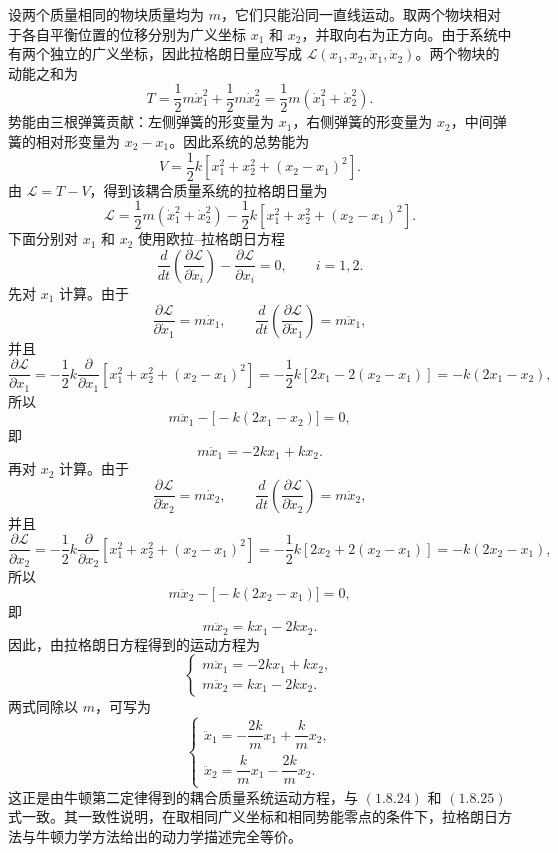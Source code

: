 \begin{solution}[耦合质量问题的拉格朗日量]
\answer
设两个质量相同的物块质量均为 \(m\)，它们只能沿同一直线运动。取两个物块相对于各自平衡位置的位移分别为广义坐标 \(x_1\) 和 \(x_2\)，并取向右为正方向。由于系统中有两个独立的广义坐标，因此拉格朗日量应写成 \(\mathcal{L}(x_1,x_2,\dot{x}_1,\dot{x}_2)\)。两个物块的动能之和为
\[
T=\frac{1}{2}m\dot{x}_1^2+\frac{1}{2}m\dot{x}_2^2=\frac{1}{2}m(\dot{x}_1^2+\dot{x}_2^2).
\]
势能由三根弹簧贡献：左侧弹簧的形变量为 \(x_1\)，右侧弹簧的形变量为 \(x_2\)，中间弹簧的相对形变量为 \(x_2-x_1\)。因此系统的总势能为
\[
V=\frac{1}{2}k\left[x_1^2+x_2^2+(x_2-x_1)^2\right].
\]
由 \(\mathcal{L}=T-V\)，得到该耦合质量系统的拉格朗日量为
\[
\mathcal{L}=\frac{1}{2}m(\dot{x}_1^2+\dot{x}_2^2)-\frac{1}{2}k\left[x_1^2+x_2^2+(x_2-x_1)^2\right].
\]
下面分别对 \(x_1\) 和 \(x_2\) 使用欧拉--拉格朗日方程
\[
\frac{d}{dt}\left(\frac{\partial \mathcal{L}}{\partial \dot{x}_i}\right)-\frac{\partial \mathcal{L}}{\partial x_i}=0,\qquad i=1,2.
\]
先对 \(x_1\) 计算。由于
\[
\frac{\partial \mathcal{L}}{\partial \dot{x}_1}=m\dot{x}_1,\qquad \frac{d}{dt}\left(\frac{\partial \mathcal{L}}{\partial \dot{x}_1}\right)=m\ddot{x}_1,
\]
并且
\[
\frac{\partial \mathcal{L}}{\partial x_1}
=-\frac{1}{2}k\frac{\partial}{\partial x_1}\left[x_1^2+x_2^2+(x_2-x_1)^2\right]
=-\frac{1}{2}k\left[2x_1-2(x_2-x_1)\right]
=-k(2x_1-x_2),
\]
所以
\[
m\ddot{x}_1-\big[-k(2x_1-x_2)\big]=0,
\]
即
\[
m\ddot{x}_1=-2kx_1+kx_2.
\]
再对 \(x_2\) 计算。由于
\[
\frac{\partial \mathcal{L}}{\partial \dot{x}_2}=m\dot{x}_2,\qquad \frac{d}{dt}\left(\frac{\partial \mathcal{L}}{\partial \dot{x}_2}\right)=m\ddot{x}_2,
\]
并且
\[
\frac{\partial \mathcal{L}}{\partial x_2}
=-\frac{1}{2}k\frac{\partial}{\partial x_2}\left[x_1^2+x_2^2+(x_2-x_1)^2\right]
=-\frac{1}{2}k\left[2x_2+2(x_2-x_1)\right]
=-k(2x_2-x_1),
\]
所以
\[
m\ddot{x}_2-\big[-k(2x_2-x_1)\big]=0,
\]
即
\[
m\ddot{x}_2=kx_1-2kx_2.
\]
因此，由拉格朗日方程得到的运动方程为
\[
\begin{cases}
m\ddot{x}_1=-2kx_1+kx_2,\\
m\ddot{x}_2=kx_1-2kx_2.
\end{cases}
\]
两式同除以 \(m\)，可写为
\[
\begin{cases}
\ddot{x}_1=-\dfrac{2k}{m}x_1+\dfrac{k}{m}x_2,\\[6pt]
\ddot{x}_2=\dfrac{k}{m}x_1-\dfrac{2k}{m}x_2.
\end{cases}
\]
这正是由牛顿第二定律得到的耦合质量系统运动方程，与 \((1.8.24)\) 和 \((1.8.25)\) 式一致。其一致性说明，在取相同广义坐标和相同势能零点的条件下，拉格朗日方法与牛顿力学方法给出的动力学描述完全等价。
\end{solution}


